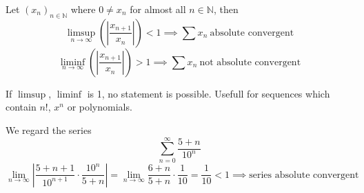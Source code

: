 \begin{proposition}\label{pro:ratio_test}
   Let \((x_n)_{n \in \mathbb{N}}\) where \(0 \neq x_n\) for almost all \(n \in \mathbb{N}\), then
   \[\limsup_{n \to \infty} \left(\left|\frac{x_{n+1}}{x_n}\right|\right) < 1 \implies \sum x_n~\text{absolute convergent}\]
   \[\liminf_{n \to \infty} \left(\left|\frac{x_{n+1}}{x_n}\right|\right) > 1 \implies \sum x_n~\text{not absolute convergent}\]
\end{proposition}
\begin{remark}
   If \(\limsup\), \(\liminf\) is 1, no statement is possible.
   Usefull for sequences which contain \(n!\), \(x^n\) or polynomials.
\end{remark}
\begin{example}
   We regard the series
   \[\sum_{n=0}^\infty \frac{5 + n}{10^n}\]
   \[\lim_{n \to \infty} \left|\frac{5 + n + 1}{10^{n+1}} \cdot \frac{10^n}{5 + n}\right| = \lim_{n \to \infty} \frac{6+n}{5+n} \cdot \frac{1}{10} = \frac{1}{10} < 1 \implies \text{series absolute convergent}\]
\end{example}


